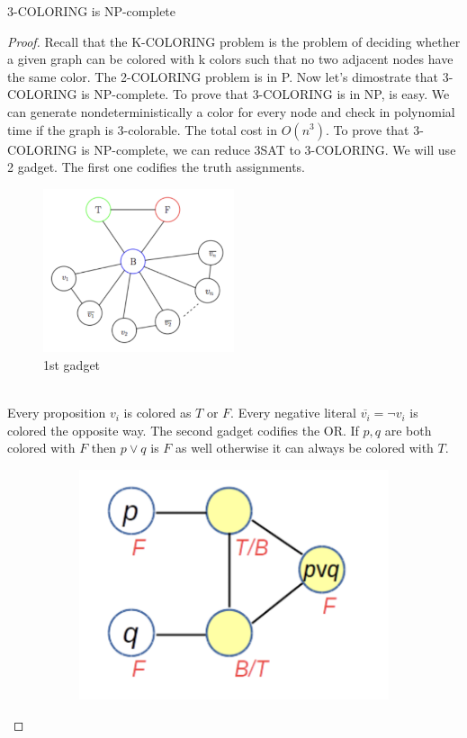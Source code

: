 \documentclass[12pt]{article}
\begin{document}
\begin{defbox}[Theorem]
  \textsc{3-COLORING} is NP-complete
\end{defbox}
\begin{proof}
  Recall that the \textsc{K-COLORING} problem is the problem of deciding whether a given graph can be colored with k colors such that no two adjacent nodes have the same color. The \textsc{2-COLORING} problem is in P. Now let's dimostrate that \textsc{3-COLORING} is NP-complete. To prove that \textsc{3-COLORING} is in NP, is easy. We can generate nondeterministically a color for every node and check in polynomial time if the graph is 3-colorable.
  The total cost in $O(n^3)$. To prove that \textsc{3-COLORING} is NP-complete, we can reduce \textsc{3SAT} to \textsc{3-COLORING}. We will use 2 gadget. The first one codifies the truth assignments.
  \\
  \begin{figure}[h]
  \centering
  \includegraphics[width=0.5\textwidth]{img/3-coloring-1g.png}
  \caption{1st gadget}
  \end{figure}
  \\
   Every proposition $v_i$ is colored as $T$ or $F$. Every negative literal $\overline{v_i}=\neg v_i$ is colored the opposite way. The second gadget codifies the OR. If $p,q$ are both colored with $F$ then $p\vee q$ is $F$ as well otherwise it can always be colored with $T$.
   \\
   \begin{figure}[h]
    \centering
    \begin{subfigure}[b]{0.3\textwidth}
        \includegraphics[width=\textwidth]{img/3-coloring-2g.png}

\end{subfigure}
\end{figure}
\end{proof}
\end{document}
